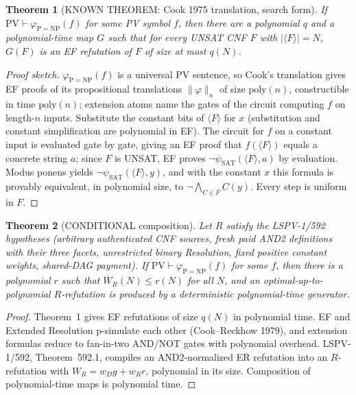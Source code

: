 \documentclass[11pt]{article}
\newtheorem{theorem}{Theorem}
\newcommand{\Wbar}{\overline W}
\begin{document}
\begin{theorem}[KNOWN THEOREM: Cook 1975 translation, search form]
If $\mathrm{PV}\vdash\varphi_{\mathrm{P=NP}}(f)$ for some PV symbol $f$, then
there are a polynomial $q$ and a polynomial-time map $G$ such that for every
UNSAT CNF $F$ with $|\langle F\rangle|=N$, $G(F)$ is an EF refutation of $F$
of size at most $q(N)$.
\end{theorem}
\begin{proof}[Proof sketch]
$\varphi_{\mathrm{P=NP}}(f)$ is a universal PV sentence, so Cook's translation
gives EF proofs of its propositional translations
$\|\varphi\|_{n}$ of size $\mathrm{poly}(n)$, constructible in time
$\mathrm{poly}(n)$; extension atoms name the gates of the circuit computing $f$
on length-$n$ inputs. Substitute the constant bits of $\langle F\rangle$ for $x$
(substitution and constant simplification are polynomial in EF). The
circuit for $f$ on a constant input is evaluated gate by gate, giving an EF
proof that $f(\langle F\rangle)$ equals a concrete string $a$; since $F$ is
UNSAT, EF proves $\neg\psi_{\mathrm{SAT}}(\langle F\rangle,a)$ by evaluation.
Modus ponens yields $\neg\psi_{\mathrm{SAT}}(\langle F\rangle,y)$, and with
the constant $x$ this formula is provably equivalent, in polynomial size, to
$\neg\bigwedge_{C\in F}C(y)$. Every step is uniform in $F$.
\end{proof}

\begin{theorem}[CONDITIONAL composition]
Let $R$ satisfy the LSPV-1/592 hypotheses (arbitrary authenticated CNF
sources, fresh paid AND2 definitions with their three facets, unrestricted
binary Resolution, fixed positive constant weights, shared-DAG payment). If
$\mathrm{PV}\vdash\varphi_{\mathrm{P=NP}}(f)$ for some $f$, then there is a
polynomial $r$ such that $\Wbar_R(N)\le r(N)$ for all $N$, and an optimal-up-to-polynomial
$R$-refutation is produced by a deterministic polynomial-time generator.
\end{theorem}
\begin{proof}
Theorem~1 gives EF refutations of size $q(N)$ in polynomial time. EF and
Extended Resolution p-simulate each other (Cook--Reckhow 1979), and extension
formulas reduce to fan-in-two AND/NOT gates with polynomial overhead. LSPV-1/592,
Theorem~592.1, compiles an AND2-normalized ER refutation into an $R$-refutation
with $W_R=w_Dg+w_Rr$, polynomial in its size. Composition of polynomial-time
maps is polynomial time.
\end{proof}
\end{document}
